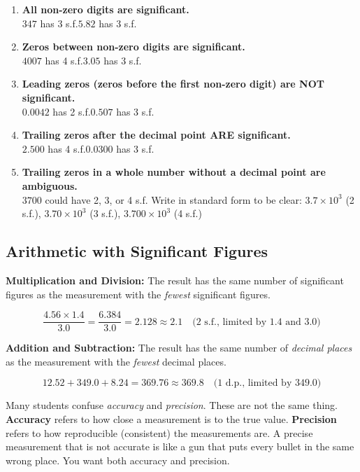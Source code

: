 \begin{enumerate}
  \item \textbf{All non-zero digits are significant.}\\
  $347$ has 3 s.f.\quad $5.82$ has 3 s.f.

  \item \textbf{Zeros between non-zero digits are
  significant.}\\
  $4007$ has 4 s.f.\quad $3.05$ has 3 s.f.

  \item \textbf{Leading zeros (zeros before the first
  non-zero digit) are NOT significant.}\\
  $0.0042$ has 2 s.f.\quad $0.507$ has 3 s.f.

  \item \textbf{Trailing zeros after the decimal point
  ARE significant.}\\
  $2.500$ has 4 s.f.\quad $0.0300$ has 3 s.f.

  \item \textbf{Trailing zeros in a whole number without
  a decimal point are ambiguous.}\\
  $3700$ could have 2, 3, or 4 s.f. Write in standard
  form to be clear: $3.7 \times 10^3$ (2 s.f.),
  $3.70 \times 10^3$ (3 s.f.), $3.700 \times 10^3$ (4 s.f.)
\end{enumerate}

\subsection{Arithmetic with Significant Figures}

\textbf{Multiplication and Division:} The result has the
same number of significant figures as the measurement with
the \textit{fewest} significant figures.

\[
  \frac{4.56 \times 1.4}{3.0}
  = \frac{6.384}{3.0} = 2.128 \approx 2.1
  \quad \text{(2 s.f., limited by 1.4 and 3.0)}
\]

\textbf{Addition and Subtraction:} The result has the same
number of \textit{decimal places} as the measurement with
the \textit{fewest} decimal places.

\[
  12.52 + 349.0 + 8.24 = 369.76 \approx 369.8
  \quad \text{(1 d.p., limited by 349.0)}
\]

\begin{misconceptionbox}
Many students confuse \textit{accuracy} and
\textit{precision}. These are not the same thing.
\textbf{Accuracy} refers to how close a measurement is
to the true value. \textbf{Precision} refers to how
reproducible (consistent) the measurements are. A
precise measurement that is not accurate is like a gun
that puts every bullet in the same wrong place. You want
both accuracy and precision.
\end{misconceptionbox}


